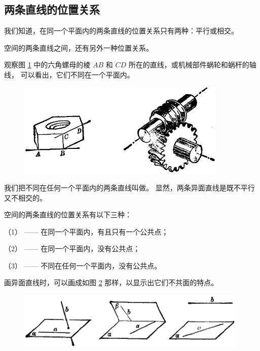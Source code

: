 \subsection{两条直线的位置关系}\label{subsec:1-4}

我们知道，在同一个平面内的两条直线\footnotemark 的位置关系只有两种：平行或相交。

空间的两条直线之间，还有另外一种位置关系。

观察图 \ref{fig:ltjh-1-11} 中的六角螺母的棱 $AB$ 和 $CD$ 所在的直线，或机械部件蜗轮和蜗杆的轴线，
可以看出，它们不同在一个平面内。

\begin{figure}[htbp]
    \centering
    \includegraphics[width=10cm]{../pic/ltjh-ch1-11.png}
    \caption{}\label{fig:ltjh-1-11}
\end{figure}

我们把不同在任何一个平面内的两条直线叫做。
显然，两条异面直线是既不平行又不相交的。

空间的两条直线的位置关系有以下三种：

（1） —— 在同一个平面内，有且只有一个公共点；

（2） —— 在同一个平面内，没有公共点；

（3） —— 不同在任何一个平面内，没有公共点。

画异面直线时，可以画成如图 \ref{fig:ltjh-1-12} 那样，以显示出它们不共面的特点。

\begin{figure}[htbp]
    \centering
    \includegraphics[width=11cm]{../pic/ltjh-ch1-12.png}
    \caption{}\label{fig:ltjh-1-12}
\end{figure}

